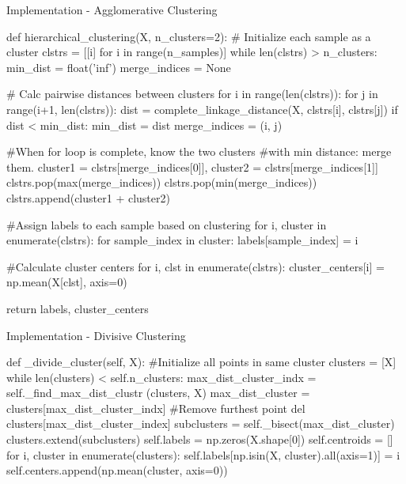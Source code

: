 \documentclass{beamer}
\begin{document}
\begin{frame}[fragile]{Implementation - Agglomerative Clustering}
    \begin{python}
   def hierarchical_clustering(X, n_clusters=2):
    # Initialize each sample as a cluster
    clstrs = [[i] for i in range(n_samples)]
    while len(clstrs) > n_clusters:
        min_dist = float('inf')
        merge_indices = None

        # Calc pairwise distances between clusters
        for i in range(len(clstrs)):
            for j in range(i+1, len(clstrs)):
                dist = complete_linkage_distance(X, clstrs[i], clstrs[j])
                if dist < min_dist:
                    min_dist = dist
                    merge_indices = (i, j)
    \end{python}
\end{frame}
\begin{frame}[fragile]
\begin{python}
    #When for loop is complete, know the two clusters
    #with min distance: merge them. 
    cluster1 = clstrs[merge_indices[0]],
    cluster2 = clstrs[merge_indices[1]]
    clstrs.pop(max(merge_indices))
    clstrs.pop(min(merge_indices))
    clstrs.append(cluster1 + cluster2)
    
    #Assign labels to each sample based on clustering
    for i, cluster in enumerate(clstrs):
        for sample_index in cluster:
            labels[sample_index] = i

    #Calculate cluster centers
    for i, clst in enumerate(clstrs):
        cluster_centers[i] = np.mean(X[clst], axis=0)

    return labels, cluster_centers
    \end{python}
\end{frame}






\begin{frame}[fragile]{Implementation - Divisive Clustering}
\begin{python}
def _divide_cluster(self, X):
    #Initialize all points in same cluster
    clusters = [X]
    while len(clusters) < self.n_clusters:
    max_dist_cluster_indx = self._find_max_dist_clustr
                            (clusters, X)
    max_dist_cluster = clusters[max_dist_cluster_indx]
    #Remove furthest point
    del clusters[max_dist_cluster_index]
    subclusters = self._bisect(max_dist_cluster) 
    clusters.extend(subclusters)
    self.labels = np.zeros(X.shape[0])
    self.centroids = []
    for i, cluster in enumerate(clusters):
      self.labels[np.isin(X, cluster).all(axis=1)] = i
      self.centers.append(np.mean(cluster, axis=0))
\end{python}
\end{frame}
\end{document}
